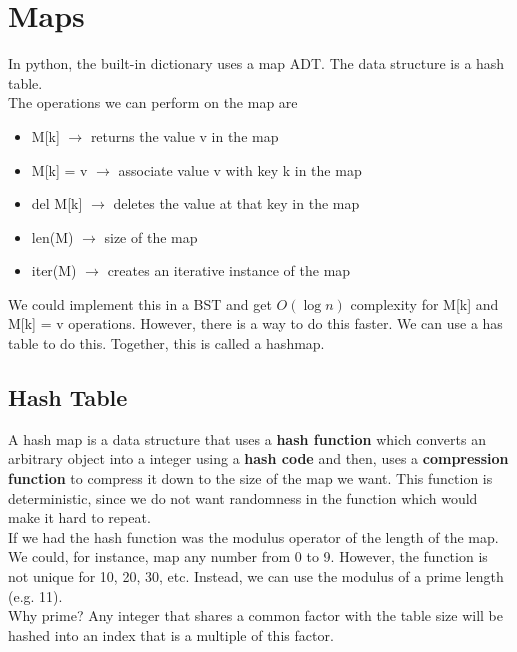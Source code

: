 \documentclass[]{article}
\begin{document}
\section{Maps}\bigbreak

In python, the built-in dictionary uses a map ADT. The data structure is a hash table.\\

The operations we can perform on the map are 

\begin{itemize}
	\item M[k] $\to$ returns the value v in the map
	\item M[k] = v $\to$ associate value v with key k in the map
	\item del M[k] $\to$ deletes the value at that key in the map
	\item len(M) $\to$ size of the map
	\item iter(M) $\to$ creates an iterative instance of the map
\end{itemize}\bigbreak

We could implement this in a BST and get $O(\log n)$ complexity for M[k] and M[k] = v operations. However, there is a way to do this faster. We can use a has table to do this. Together, this is called a hashmap.\\

\subsection{Hash Table}\bigbreak

A hash map is a data structure that uses a \textbf{hash function} which converts an arbitrary object into a integer using a \textbf{hash code} and then, uses a \textbf{compression function} to compress it down to the size of the map we want. This function is deterministic, since we do not want randomness in the function which would make it hard to repeat. \\


If we had the hash function was the modulus operator of the length of the map. We could, for instance, map any number from 0 to 9. However, the function is not unique for 10, 20, 30, etc. Instead, we can use the modulus of a prime length (e.g. 11).\\

Why prime? Any integer that shares a common factor with the table size will be hashed into an index that is a multiple of this factor. \\
\end{document}
